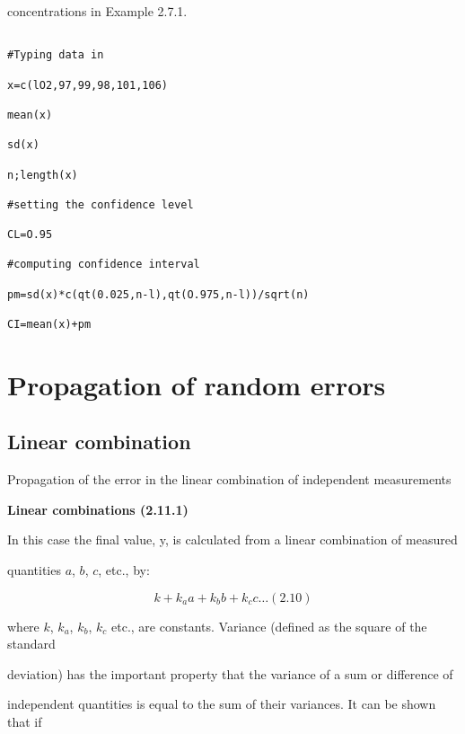 concentrations in Example 2.7.1.

\begin{verbatim}

#Typing data in

x=c(lO2,97,99,98,101,106)

mean(x)

sd(x)

n;length(x)

#setting the confidence level

CL=O.95

#computing confidence interval

pm=sd(x)*c(qt(0.025,n-l),qt(O.975,n-l))/sqrt(n)

CI=mean(x)+pm

\end{verbatim}

 






 

\section{Propagation of random errors}

 

\subsection{Linear combination}

Propagation of the error in the linear combination of independent measurements

 

\noindent \textbf{Linear combinations (2.11.1)}

 

In this case the final value, y, is calculated from a linear combination of measured

quantities $a$, $b$, $c$, etc., by:

\[k +k_aa+k_bb+k_cc\ldots (2.10)\]

where $k$, $k_a$, $k_b$, $k_c$ etc., are constants. Variance (defined as the square of the standard

deviation) has the important property that the variance of a sum or difference of

independent quantities is equal to the sum of their variances. It can be shown that if

